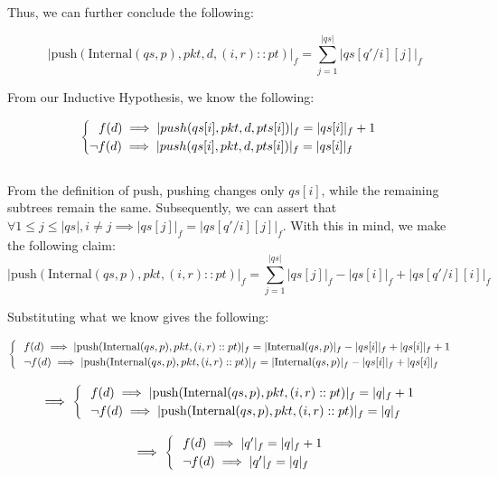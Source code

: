 \documentclass{amsart}
\begin{document}
Thus, we can further conclude the following:

$$|\text{push}(\text{Internal}(qs, p), pkt, d, (i, r) :: pt)|_f = \sum_{j=1}^{|qs|} |qs[q'/i][j]|_f$$

From our Inductive Hypothesis, we know the following:

$$\begin{cases}
    \hspace{0.25cm} \text{$f(d) \implies |push(qs[i], pkt, d, pts[i])|_f = |qs[i]|_f + 1$}\\
    \text{$\neg f(d) \implies |push(qs[i], pkt, d, pts[i])|_f = |qs[i]|_f$}
\end{cases}$$\\[-5pt]

From the definition of $\text{push}$, pushing changes only $qs[i]$, while the remaining subtrees remain the same. Subsequently, we can assert that $\forall 
1 \leq j \leq |qs|, i \neq j \implies |qs[j]|_f = |qs[q'/i][j]|_f$. With this in mind, we make the following claim:\\[-15pt]

$$|\text{push}(\text{Internal}(qs, p), pkt, (i, r) :: pt)|_f = \sum_{j=1}^{|qs|} |qs[j]|_f - |qs[i]|_f + |qs[q'/i][i]|_f$$

Substituting what we know gives the following:

$$\begin{cases}
    \hspace{0.25cm} f(d) \implies |\text{push}(\text{Internal}(qs, p), pkt, (i, r) :: pt)|_f = |\text{Internal}(qs, p)|_f - |qs[i]|_f + |qs[i]|_f + 1\\
    \hspace{0.25cm} \neg f(d) \implies |\text{push}(\text{Internal}(qs, p), pkt, (i, r) :: pt)|_f = |\text{Internal}(qs, p)|_f - |qs[i]|_f + |qs[i]|_f\\
\end{cases}$$

$$\implies \begin{cases}
    \hspace{0.25cm} f(d) \implies |\text{push}(\text{Internal}(qs, p), pkt, (i, r) :: pt)|_f = |q|_f + 1\\
    \hspace{0.25cm} \neg f(d) \implies |\text{push}(\text{Internal}(qs, p), pkt, (i, r) :: pt)|_f = |q|_f \\
\end{cases}$$

$$\implies \begin{cases}
    \hspace{0.25cm} f(d) \implies |q'|_f = |q|_f + 1\\
    \hspace{0.25cm} \neg f(d) \implies|q'|_f = |q|_f \\
\end{cases}$$
\end{document}
